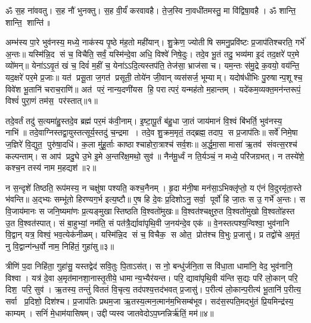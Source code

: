 \setcounter{anuvakam}{0}
ॐ स॒ह ना॑ववतु। स॒ह नौ॑ भुनक्तु। स॒ह वी॒र्यं॑ करवावहै। ते॒ज॒स्वि ना॒वधी॑तमस्तु॒ मा वि॑द्विषा॒वहै। ॐ शान्ति॒ शान्ति॒ शान्ति॑॥

अम्भ॑स्य पा॒रे भुव॑नस्य॒ मध्ये॒ नाक॑स्य पृ॒ष्ठे म॑ह॒तो मही॑यान्। शु॒क्रेण॒ ज्योतीषि समनु॒प्रवि॑ष्टः प्र॒जाप॑तिश्चरति॒ गर्भे॑ अ॒न्तः॥ यस्मि॑न्नि॒द सं च॒ विचैति॒ सर्वं॒ यस्मि॑न्दे॒वा अधि॒ विश्वे॑ निषे॒दुः। तदे॒व भू॒तं तदु॒ भव्य॑मा इ॒दं तद॒क्षरे॑ पर॒मे व्यो॑मन्॥ येना॑ऽऽवृ॒तं खं च॒ दिवं॑ म॒हीं च॒ येना॑ऽऽदि॒त्यस्तप॑ति॒ तेज॑सा॒ भ्राज॑सा च। यम॒न्तः स॑मु॒द्रे क॒वयो॒ वय॑न्ति॒ यद॒क्षरे॑ पर॒मे प्र॒जाः॥ यत॑ प्रसू॒ता ज॒गत॑ प्रसूती॒ तोये॑न जी॒वान् व्यस॑सर्ज॒ भूम्याम्। यदोष॑धीभिः पु॒रुषान्प॒शूश्च॒ विवे॑श भू॒तानि॑ चराच॒राणि॑॥ अत॑ परं॒ नान्य॒दणी॑यस हि॒ परात्परं॒ यन्मह॑तो म॒हान्तम्। यदे॑कम॒व्यक्त॒मन॑न्तरूपं॒ विश्वं॑ पुरा॒णं तम॑स॒ पर॑स्तात्॥१॥

तदे॒वर्तं तदु॑ स॒त्यमा॑हु॒स्तदे॒व ब्रह्म॑ पर॒मं क॑वी॒नाम्। इ॒ष्टा॒पू॒र्तं ब॑हु॒धा जा॒तं जाय॑मानं वि॒श्वं बि॑भर्ति॒ भुव॑नस्य॒ नाभि॑॥ तदे॒वाग्निस्तद्वा॒युस्तत्सूर्य॒स्तदु॑ च॒न्द्रमा। तदे॒व शु॒क्रम॒मृतं॒ तद्ब्रह्म॒ तदाप॒ स प्र॒जाप॑तिः॥ सर्वे॑ निमे॒षा ज॒ज्ञिरे॑ वि॒द्युत॒ पुरु॑षा॒दधि॑। क॒ला मु॑हू॒र्ताः काष्ठाश्चाहोरा॒त्राश्च॑ सर्व॒शः॥ अ॒र्द्ध॒मा॒सा मासा॑ ऋ॒तव॑ संवत्स॒रश्च॑ कल्पन्ताम्। स आप॑ प्रदु॒घे उ॒भे इ॒मे अ॒न्तरि॑क्ष॒मथो॒ सुव॑॥ नैन॑मू॒र्ध्वं न ति॒र्यञ्चं॒ न मध्ये॒ परि॑जग्रभत्। न तस्ये॑शे॒ कश्च॒न तस्य॑ नाम म॒हद्यश॑॥२॥

न स॒न्दृशे॑ तिष्ठति॒ रूप॑मस्य॒ न चक्षु॑षा पश्यति॒ कश्च॒नैनम्। हृ॒दा म॑नी॒षा मन॑सा॒ऽभिक्लृ॑प्तो॒ य ए॑नं वि॒दुरमृ॑ता॒स्ते भ॑वन्ति॥ अ॒द्भ्यः सम्भू॑तो हिरण्यग॒र्भ इत्य॒ष्टौ॥ ए॒ष हि दे॒वः प्र॒दिशोऽनु॒ सर्वा॒ पूर्वो॑ हि जा॒तः स उ॒ गर्भे॑ अ॒न्तः। स वि॒जाय॑मानः स जनि॒ष्यमा॑णः प्र॒त्यङ्मुखास्तिष्ठति वि॒श्वतो॑मुखः॥ वि॒श्वत॑श्चक्षुरु॒त वि॒श्वतो॑मुखो वि॒श्वतो॑हस्त उ॒त वि॒श्वत॑स्पात्। सं बा॒हुभ्यां॒ नम॑ति॒ सं पत॑त्रै॒र्द्यावा॑पृथि॒वी ज॒नय॑न्दे॒व एक॑॥ वे॒नस्तत्पश्य॒न्विश्वा॒ भुव॑नानि वि॒द्वान् यत्र॒ विश्वं॒ भव॒त्येक॑नीळम्। यस्मि॑न्नि॒द सं च॒ विचैक॒ स ओत॒ प्रोत॑श्च वि॒भुः प्र॒जासु॑। प्र तद्वो॑चे अ॒मृतं॒ नु वि॒द्वान्ग॑न्ध॒र्वो नाम॒ निहि॑तं॒ गुहा॑सु॥३॥

त्रीणि॑ प॒दा निहि॑ता॒ गुहा॑सु॒ यस्तद्वेद॑ सवि॒तुः पि॒ताऽस॑त्। स नो॒ बन्धु॑र्जनि॒ता स वि॑धा॒ता धामा॑नि॒ वेद॒ भुव॑नानि॒ विश्वा। यत्र॑ दे॒वा अ॒मृत॑मानशा॒नास्तृ॒तीये॒ धामान्य॒भ्यैर॑यन्त। परि॒ द्यावा॑पृथि॒वी य॑न्ति स॒द्यः परि॑ लो॒कान् परि॒ दिश॒ परि॒ सुव॑। ऋ॒तस्य॒ तन्तुं॑ विततं वि॒चृत्य॒ तद॑पश्य॒त्तद॑भवत् प्र॒जासु॑। प॒रीत्य॑ लो॒कान्प॒रीत्य॑ भू॒तानि॑ प॒रीत्य॒ सर्वा प्र॒दिशो॒ दिश॑श्च। प्र॒जाप॑तिः प्रथम॒जा ऋ॒तस्य॒\aav{}\aav{}त्मन॒\aav{}\aav{}त्मान॑म॒भिसम्ब॑भूव। सद॑स॒स्पति॒मद्भु॑तं प्रि॒यमिन्द्र॑स्य॒ काम्यम्। सनिं॑ मे॒धाम॑यासिषम्। उद्दीप्यस्व जातवेदोऽप॒घ्नन्निर्\mbox{}ऋ॑तिं॒ मम॑॥४॥

